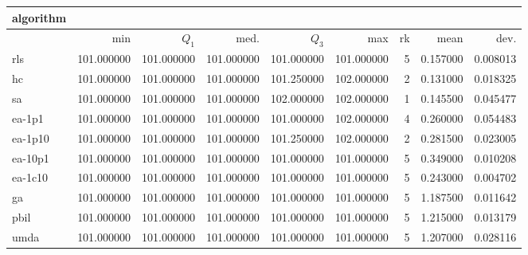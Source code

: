 \begin{tabular}{@{}l*{5}{>{{}}N{3}{0}}>{{}}N{2}{0}N{1}{3}N{1}{3}@{}}
\toprule
{algorithm} &  &  \\
\midrule
& {min} & {$Q_1$} & {med.} & {$Q_3$} & {max} & {rk} & {mean} & {dev.} \\
\midrule
rls & {\color{blue}} 101.000000 & {\color{blue}} 101.000000 & {\color{blue}} 101.000000 & 101.000000 & 101.000000 & 5 & 0.157000 & 0.008013 \\
 hc & {\color{blue}} 101.000000 & {\color{blue}} 101.000000 & {\color{blue}} 101.000000 & 101.250000 & {\color{blue}} 102.000000 & 2 & 0.131000 & 0.018325 \\
 sa & {\color{blue}} 101.000000 & {\color{blue}} 101.000000 & {\color{blue}} 101.000000 & {\color{blue}} 102.000000 & {\color{blue}} 102.000000 & 1 & 0.145500 & 0.045477 \\
 ea-1p1 & {\color{blue}} 101.000000 & {\color{blue}} 101.000000 & {\color{blue}} 101.000000 & 101.000000 & {\color{blue}} 102.000000 & 4 & 0.260000 & 0.054483 \\
 ea-1p10 & {\color{blue}} 101.000000 & {\color{blue}} 101.000000 & {\color{blue}} 101.000000 & 101.250000 & {\color{blue}} 102.000000 & 2 & 0.281500 & 0.023005 \\
 ea-10p1 & {\color{blue}} 101.000000 & {\color{blue}} 101.000000 & {\color{blue}} 101.000000 & 101.000000 & 101.000000 & 5 & 0.349000 & 0.010208 \\
 ea-1c10 & {\color{blue}} 101.000000 & {\color{blue}} 101.000000 & {\color{blue}} 101.000000 & 101.000000 & 101.000000 & 5 & 0.243000 & 0.004702 \\
 ga & {\color{blue}} 101.000000 & {\color{blue}} 101.000000 & {\color{blue}} 101.000000 & 101.000000 & 101.000000 & 5 & 1.187500 & 0.011642 \\
 pbil & {\color{blue}} 101.000000 & {\color{blue}} 101.000000 & {\color{blue}} 101.000000 & 101.000000 & 101.000000 & 5 & 1.215000 & 0.013179 \\
 umda & {\color{blue}} 101.000000 & {\color{blue}} 101.000000 & {\color{blue}} 101.000000 & 101.000000 & 101.000000 & 5 & 1.207000 & 0.028116 \\
 \bottomrule
\end{tabular}
